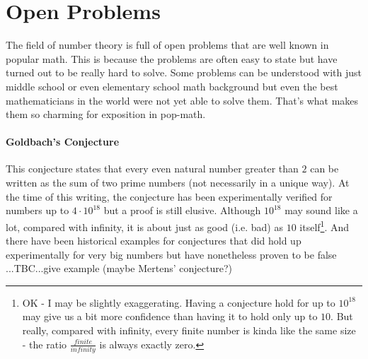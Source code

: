 \section{Open Problems}
The field of number theory is full of open problems that are well known in popular math. This is because the problems are often easy to state but have turned out to be really hard to solve. Some problems can be understood with just middle school or even elementary school math background but even the best mathematicians in the world were not yet able to solve them. That's what makes them so charming for exposition in pop-math.

\paragraph{Goldbach's Conjecture}
This conjecture states that every even natural number greater than $2$ can be written as the sum of two prime numbers (not necessarily in a unique way). At the time of this writing, the conjecture has been experimentally verified for numbers up to $4 \cdot 10^{18}$ but a proof is still elusive. Although $10^{18}$ may sound like a lot, compared with infinity, it is about just as good (i.e. bad) as $10$ itself\footnote{OK - I may be slightly exaggerating. Having a conjecture hold for up to $10^{18}$ may give us a bit more confidence than having it to hold only up to $10$. But really, compared with infinity, every finite number is kinda like the same size - the ratio $\frac{finite}{infinity}$ is always exactly zero.}. And there have been historical examples for conjectures that did hold up experimentally for very big numbers but have nonetheless proven to be false ...TBC...give example (maybe Mertens' conjecture?)



% 

